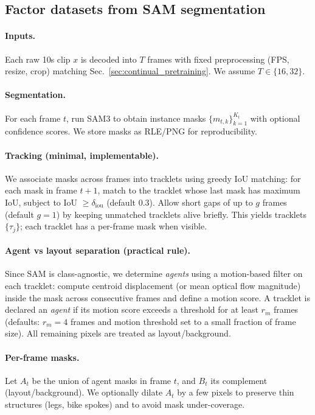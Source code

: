 \subsection{Factor datasets from SAM segmentation}\label{sec:surgery_factor_datasets}
\paragraph{Inputs.} Each raw 10s clip $x$ is decoded into $T$ frames with fixed preprocessing (FPS, resize, crop) matching Sec.~\ref{sec:continual_pretraining}. We assume $T\in\{16,32\}$.
\paragraph{Segmentation.} For each frame $t$, run SAM3 to obtain instance masks $\{m_{t,k}\}_{k=1}^{K_t}$ with optional confidence scores. We store masks as RLE/PNG for reproducibility.
\paragraph{Tracking (minimal, implementable).} We associate masks across frames into tracklets using greedy IoU matching:
for each mask in frame $t{+}1$, match to the tracklet whose last mask has maximum IoU, subject to IoU $\ge \delta_{\text{iou}}$ (default 0.3). Allow short gaps of up to $g$ frames (default $g{=}1$) by keeping unmatched tracklets alive briefly.
This yields tracklets $\{\tau_j\}$; each tracklet has a per-frame mask when visible.
\paragraph{Agent vs layout separation (practical rule).} Since SAM is class-agnostic, we determine \emph{agents} using a motion-based filter on each tracklet:
compute centroid displacement (or mean optical flow magnitude) inside the mask across consecutive frames and define a motion score.
A tracklet is declared an \emph{agent} if its motion score exceeds a threshold for at least $r_m$ frames (defaults: $r_m{=}4$ frames and motion threshold set to a small fraction of frame size).
All remaining pixels are treated as layout/background.
\paragraph{Per-frame masks.} Let $A_t$ be the union of agent masks in frame $t$, and $B_t$ its complement (layout/background).
We optionally dilate $A_t$ by a few pixels to preserve thin structures (legs, bike spokes) and to avoid mask under-coverage.
